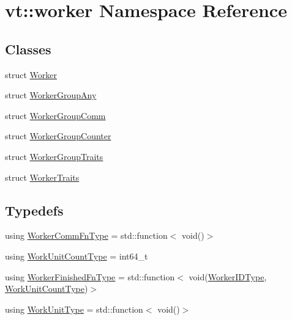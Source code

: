 \hypertarget{namespacevt_1_1worker}{}\section{vt\+:\+:worker Namespace Reference}
\label{namespacevt_1_1worker}
\subsection*{Classes}
\begin{DoxyCompactItemize}
\item 
struct \hyperlink{structvt_1_1worker_1_1_worker}{Worker}
\item 
struct \hyperlink{structvt_1_1worker_1_1_worker_group_any}{Worker\+Group\+Any}
\item 
struct \hyperlink{structvt_1_1worker_1_1_worker_group_comm}{Worker\+Group\+Comm}
\item 
struct \hyperlink{structvt_1_1worker_1_1_worker_group_counter}{Worker\+Group\+Counter}
\item 
struct \hyperlink{structvt_1_1worker_1_1_worker_group_traits}{Worker\+Group\+Traits}
\item 
struct \hyperlink{structvt_1_1worker_1_1_worker_traits}{Worker\+Traits}
\end{DoxyCompactItemize}
\subsection*{Typedefs}
\begin{DoxyCompactItemize}
\item 
using \hyperlink{namespacevt_1_1worker_af5cc6dd44a4444b2e5498ca279a9f04d}{Worker\+Comm\+Fn\+Type} = std\+::function$<$ void()$>$
\item 
using \hyperlink{namespacevt_1_1worker_a8080c49350b0520151601a8b24d6c6cf}{Work\+Unit\+Count\+Type} = int64\+\_\+t
\item 
using \hyperlink{namespacevt_1_1worker_ae32a174a5348d27aafe73c2debea1a94}{Worker\+Finished\+Fn\+Type} = std\+::function$<$ void(\hyperlink{namespacevt_a656e362091da17b9b93d0655b36e3392}{Worker\+I\+D\+Type}, \hyperlink{namespacevt_1_1worker_a8080c49350b0520151601a8b24d6c6cf}{Work\+Unit\+Count\+Type})$>$
\item 
using \hyperlink{namespacevt_1_1worker_a59d2fcdafa81fc0af7f921a258e42202}{Work\+Unit\+Type} = std\+::function$<$ void()$>$
\end{DoxyCompactItemize}
